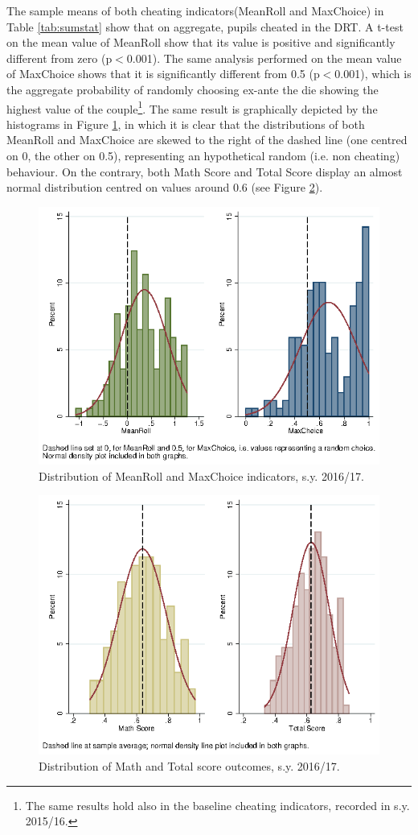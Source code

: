 \documentclass[authoryear, preprint, review, 12pt]{elsarticle}
\begin{document}
The sample means of both cheating indicators(MeanRoll and MaxChoice) in Table \ref{tab:sumstat} show that on aggregate, pupils cheated in the DRT. A t-test on the mean value of MeanRoll show that its value is positive and significantly different from zero (p$<$0.001). The same analysis performed on the mean value of MaxChoice shows that it is significantly different from 0.5 (p$<$0.001), which is the aggregate probability of randomly choosing ex-ante the die showing the highest value of the couple\footnote{The same results hold also in the baseline cheating indicators, recorded in s.y. 2015/16.}.
The same result is graphically depicted by the histograms in Figure \ref{fig:cheating}, in which it is clear that the distributions of both MeanRoll and MaxChoice are skewed to the right of the dashed line (one centred on 0, the other on 0.5), representing an hypothetical random (i.e. non cheating) behaviour. On the contrary, both Math Score and Total Score display an almost normal distribution centred on values around 0.6 (see Figure \ref{fig:performance}).

\begin{figure}[!h]
  \centering
	\includegraphics[width=.8\linewidth]{figures/hist_meanrollANDmaxchoice.eps} \caption{Distribution of MeanRoll and MaxChoice indicators, s.y. 2016/17.}\label{fig:cheating}
\end{figure}

\begin{figure}[!h]
  \centering
	\includegraphics[width=.8\linewidth]{figures/hist_mathANDtot.eps} \caption{Distribution of Math and Total score outcomes, s.y. 2016/17.}\label{fig:performance}
\end{figure}
\end{document}
